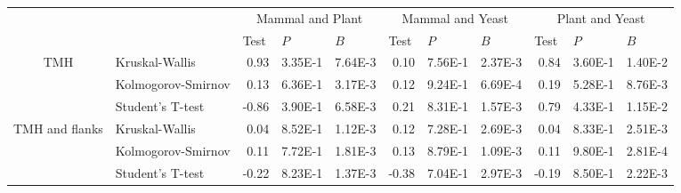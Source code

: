 \begin{table}[htbp]
    \begin{tabular}{clrrrrrrrrr}
          &       & \multicolumn{3}{c}{Mammal and Plant} & \multicolumn{3}{c}{Mammal and Yeast} & \multicolumn{3}{c}{Plant and Yeast} \\
          &       & \multicolumn{1}{l}{Test} & \multicolumn{1}{l}{$P$} & \multicolumn{1}{l}{$B$} & \multicolumn{1}{l}{Test} & \multicolumn{1}{l}{$P$} & \multicolumn{1}{l}{$B$} & \multicolumn{1}{l}{Test} & \multicolumn{1}{l}{$P$} & \multicolumn{1}{l}{$B$} \\
    \multirow{3}[0]{*}{TMH } &  Kruskal-Wallis & 0.93  & 3.35E-1 & 7.64E-3 & 0.10  & 7.56E-1 & 2.37E-3 & 0.84  & 3.60E-1 & 1.40E-2 \\
          &  Kolmogorov-Smirnov & 0.13  & 6.36E-1 & 3.17E-3 & 0.12  & 9.24E-1 & 6.69E-4 & 0.19  & 5.28E-1 & 8.76E-3 \\
          &  Student's T-test & -0.86 & 3.90E-1 & 6.58E-3 & 0.21  & 8.31E-1 & 1.57E-3 & 0.79  & 4.33E-1 & 1.15E-2 \\
    \multirow{3}[0]{*}{TMH and flanks } &  Kruskal-Wallis & 0.04  & 8.52E-1 & 1.12E-3 & 0.12  & 7.28E-1 & 2.69E-3 & 0.04  & 8.33E-1 & 2.51E-3 \\
          &  Kolmogorov-Smirnov & 0.11  & 7.72E-1 & 1.81E-3 & 0.13  & 8.79E-1 & 1.09E-3 & 0.11  & 9.80E-1 & 2.81E-4 \\
          &  Student's T-test & -0.22 & 8.23E-1 & 1.37E-3 & -0.38 & 7.04E-1 & 2.97E-3 & -0.19 & 8.50E-1 & 2.22E-3 \\
    \end{tabular}%
				\label{table:speciestableswissprotstats}

\end{table}%


